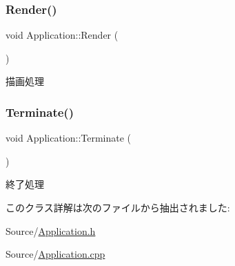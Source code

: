 \subsubsection{\texorpdfstring{Render()}{Render()}}
{\footnotesize\ttfamily void Application\+::\+Render (\begin{DoxyParamCaption}{ }\end{DoxyParamCaption})}



描画処理 

\mbox{\label{class_application_adac7ae00e5a8b79f75295d8a79aef852}} 
\subsubsection{\texorpdfstring{Terminate()}{Terminate()}}
{\footnotesize\ttfamily void Application\+::\+Terminate (\begin{DoxyParamCaption}{ }\end{DoxyParamCaption})}



終了処理 



このクラス詳解は次のファイルから抽出されました\+:\begin{DoxyCompactItemize}
\item 
Source/\mbox{\hyperlink{_application_8h}{Application.\+h}}\item 
Source/\mbox{\hyperlink{_application_8cpp}{Application.\+cpp}}\end{DoxyCompactItemize}
